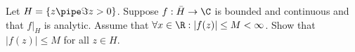 Let $H=\{z\pipe \Im z>0\}$. Suppose $f:\bar{H}\rightarrow \C$ is
bounded and continuous and that $f|_H$ is analytic. Assume that
$\forall x\in \R:|f(z)|\leq M<\infty$. Show that $|f(z)|\leq M$ for
all $z\in H$.
